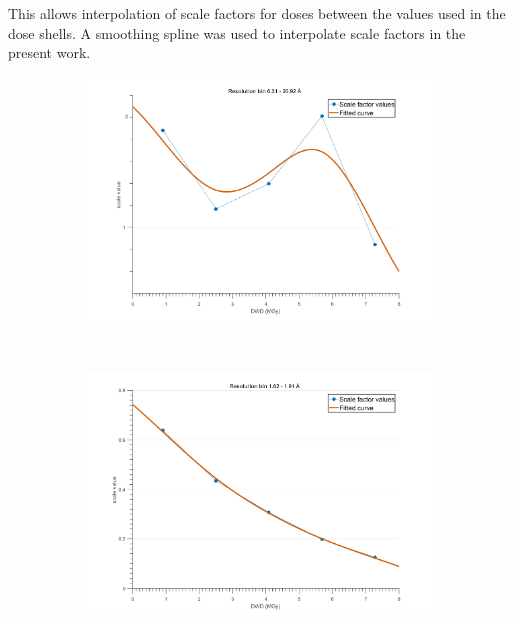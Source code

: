 This allows interpolation of scale factors for doses between the values used in the dose shells.
A smoothing spline was used to interpolate scale factors in the present work.
\begin{figure}
        \centering
        \begin{subfigure}[b]{1\textwidth}
                \centering
                \includegraphics[width=\textwidth]{figures/zde/scale_fit_bin1.pdf}
                \caption{}
                \label{fig:monotonic scale factor - Extrapolation method}
        \end{subfigure}
				\\
        \begin{subfigure}[b]{1\textwidth}
                \centering
                \includegraphics[width=\textwidth]{figures/zde/scale_fit_bin12.pdf}

\end{subfigure}
\end{figure}
